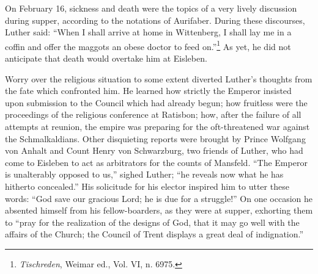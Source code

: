 On February 16, sickness and death were the topics of a very lively
discussion during supper, according to the notations of Aurifaber.
During these discourses, Luther said: “When I shall arrive at home
in Wittenberg, I shall lay me in a coffin and offer the maggots an
obese doctor to feed on.”\footnote{\textit{Tischreden}, Weimar ed., Vol. VI, n. 6975.}
 As yet, he did not anticipate that death
would overtake him at Eisleben.

Worry over the religious situation to some extent diverted Luther’s thoughts
from the fate which confronted him. He learned how
strictly the Emperor insisted upon submission to the Council which
had already begun; how fruitless were the proceedings of the religious
conference at Ratisbon; how, after the failure of all attempts at reunion,
the empire was preparing for the oft-threatened war against
the Schmalkaldians. Other disquieting reports were brought by Prince
Wolfgang von Anhalt and Count Henry von Schwarzburg, two
friends of Luther, who had come to Eisleben to act as arbitrators for
the counts of Mansfeld. “The Emperor is unalterably opposed to us,”
sighed Luther; “he reveals now what he has hitherto concealed.” His
solicitude for his elector inspired him to utter these words: “God save
our gracious Lord; he is due for a struggle!” On one occasion he absented
himself from his fellow-boarders, as they were at supper, exhorting them
to “pray for the realization of the designs of God, that
it may go well with the affairs of the Church; the Council of Trent
displays a great deal of indignation.”

